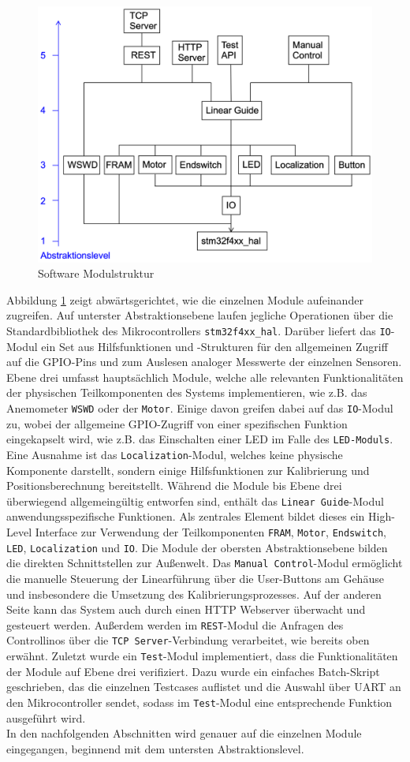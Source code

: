 \begin{figure}[h]
	\centering
	\includegraphics[width=0.6\linewidth]{images/Software/Modulestructure.png}
	\caption{Software Modulstruktur}
	\label{fig:modulestructure}
\end{figure}
\noindent
Abbildung \ref{fig:modulestructure} zeigt abwärtsgerichtet, wie die einzelnen Module aufeinander zugreifen. Auf unterster Abstraktionsebene laufen jegliche Operationen über die Standardbibliothek des Mikrocontrollers \texttt{stm32f4xx\_hal}. Darüber liefert das \texttt{IO}-Modul ein Set aus Hilfsfunktionen und -Strukturen für den allgemeinen Zugriff auf die GPIO-Pins und zum Auslesen analoger Messwerte der einzelnen Sensoren. Ebene drei umfasst hauptsächlich Module, welche alle relevanten Funktionalitäten der physischen Teilkomponenten des Systems implementieren, wie z.B. das Anemometer \texttt{WSWD} oder der \texttt{Motor}. Einige davon greifen dabei auf das \texttt{IO}-Modul zu, wobei der allgemeine GPIO-Zugriff von einer spezifischen Funktion eingekapselt wird, wie z.B. das Einschalten einer LED im Falle des \texttt{LED-Moduls}. Eine Ausnahme ist das \texttt{Localization}-Modul, welches keine physische Komponente darstellt, sondern einige Hilfsfunktionen zur Kalibrierung und Positionsberechnung bereitstellt. Während die Module bis Ebene drei überwiegend allgemeingültig entworfen sind, enthält das \texttt{Linear Guide}-Modul anwendungsspezifische Funktionen. Als zentrales Element bildet dieses ein High-Level Interface zur Verwendung der Teilkomponenten \texttt{FRAM}, \texttt{Motor}, \texttt{Endswitch}, \texttt{LED}, \texttt{Localization} und \texttt{IO}. Die Module der obersten Abstraktionsebene bilden die direkten Schnittstellen zur Außenwelt. Das \texttt{Manual Control}-Modul ermöglicht die manuelle Steuerung der Linearführung über die User-Buttons am Gehäuse und insbesondere die Umsetzung des Kalibrierungsprozesses. Auf der anderen Seite kann das System auch durch einen HTTP Webserver überwacht und gesteuert werden. Außerdem werden im \texttt{REST}-Modul die Anfragen des Controllinos über die \texttt{TCP Server}-Verbindung verarbeitet, wie bereits oben erwähnt. Zuletzt wurde ein \texttt{Test}-Modul implementiert, dass die Funktionalitäten der Module auf Ebene drei verifiziert. Dazu wurde ein einfaches Batch-Skript geschrieben, das die einzelnen Testcases auflistet und die Auswahl über UART an den  Mikrocontroller sendet, sodass im \texttt{Test}-Modul eine entsprechende Funktion ausgeführt wird.\\In den nachfolgenden Abschnitten wird genauer auf die einzelnen Module eingegangen, beginnend mit dem untersten Abstraktionslevel.

